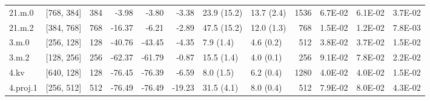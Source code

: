 \begin{table}
\begin{tabular}{llrrrrllrrrr}
21.m.0 & [768, 384] & 384 & {\cellcolor[HTML]{F5FBB2}} \color[HTML]{000000} -3.98 & {\cellcolor[HTML]{F4FAB0}} \color[HTML]{000000} -3.80 & {\cellcolor[HTML]{F2FAAE}} \color[HTML]{000000} -3.38 & 23.9 (15.2) & 13.7 (2.4) & 1536 & {\cellcolor[HTML]{FFF2AA}} \color[HTML]{000000} 6.7E-02 & {\cellcolor[HTML]{FFFAB6}} \color[HTML]{000000} 6.1E-02 & {\cellcolor[HTML]{E8F59F}} \color[HTML]{000000} 3.7E-02 \\
21.m.2 & [384, 768] & 768 & {\cellcolor[HTML]{FEEB9D}} \color[HTML]{000000} -16.37 & {\cellcolor[HTML]{FBFDBA}} \color[HTML]{000000} -6.21 & {\cellcolor[HTML]{F1F9AC}} \color[HTML]{000000} -2.89 & 47.5 (15.2) & 12.0 (1.3) & 768 & {\cellcolor[HTML]{C5E67E}} \color[HTML]{000000} 1.5E-02 & {\cellcolor[HTML]{BFE47A}} \color[HTML]{000000} 1.2E-02 & {\cellcolor[HTML]{B9E176}} \color[HTML]{000000} 7.8E-03 \\
3.m.0 & [256, 128] & 128 & {\cellcolor[HTML]{F99355}} \color[HTML]{000000} -40.76 & {\cellcolor[HTML]{F8864F}} \color[HTML]{F1F1F1} -43.45 & {\cellcolor[HTML]{F5FBB2}} \color[HTML]{000000} -4.35 & 7.9 (1.4) & 4.6 (0.2) & 512 & {\cellcolor[HTML]{E8F59F}} \color[HTML]{000000} 3.8E-02 & {\cellcolor[HTML]{E8F59F}} \color[HTML]{000000} 3.7E-02 & {\cellcolor[HTML]{C5E67E}} \color[HTML]{000000} 1.5E-02 \\
3.m.2 & [128, 256] & 256 & {\cellcolor[HTML]{D83128}} \color[HTML]{F1F1F1} -62.37 & {\cellcolor[HTML]{D93429}} \color[HTML]{F1F1F1} -61.79 & {\cellcolor[HTML]{ECF7A6}} \color[HTML]{000000} -0.87 & 15.5 (1.4) & 4.0 (0.1) & 256 & {\cellcolor[HTML]{FED481}} \color[HTML]{000000} 9.1E-02 & {\cellcolor[HTML]{FEE797}} \color[HTML]{000000} 7.8E-02 & {\cellcolor[HTML]{D1EC86}} \color[HTML]{000000} 2.2E-02 \\
4.kv & [640, 128] & 128 & {\cellcolor[HTML]{A50026}} \color[HTML]{F1F1F1} -76.45 & {\cellcolor[HTML]{A50026}} \color[HTML]{F1F1F1} -76.39 & {\cellcolor[HTML]{FBFDBA}} \color[HTML]{000000} -6.59 & 8.0 (1.5) & 6.2 (0.4) & 1280 & {\cellcolor[HTML]{EBF7A3}} \color[HTML]{000000} 4.0E-02 & {\cellcolor[HTML]{EBF7A3}} \color[HTML]{000000} 4.0E-02 & {\cellcolor[HTML]{C7E77F}} \color[HTML]{000000} 1.5E-02 \\
4.proj.1 & [256, 512] & 512 & {\cellcolor[HTML]{A50026}} \color[HTML]{F1F1F1} -76.49 & {\cellcolor[HTML]{A50026}} \color[HTML]{F1F1F1} -76.49 & {\cellcolor[HTML]{FEE593}} \color[HTML]{000000} -19.23 & 31.5 (4.1) & 8.0 (0.4) & 512 & {\cellcolor[HTML]{FEE695}} \color[HTML]{000000} 7.9E-02 & {\cellcolor[HTML]{FEE593}} \color[HTML]{000000} 8.0E-02 & {\cellcolor[HTML]{EEF8A8}} \color[HTML]{000000} 4.3E-02 \\

\end{tabular}
\end{table}
